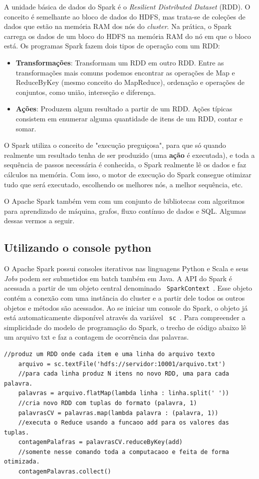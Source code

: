A unidade básica de dados do Spark é o \textit{Resilient Distributed Dataset} (RDD). O conceito é semelhante ao bloco de dados do HDFS, mas trata-se de coleções de dados que estão na memória RAM dos nós do \textit{cluster}. Na prática, o Spark carrega os dados de um bloco do HDFS na memória RAM do nó em que o bloco está. Os programas Spark fazem dois tipos de operação com um RDD:
\begin{itemize}
	\item \textbf{Transformações}: Transformam um RDD em outro RDD. Entre as transformações mais comuns podemos encontrar as operações de Map e ReduceByKey (mesmo conceito do MapReduce), ordenação e operações de conjuntos, como união, interseção e diferença.
	\item \textbf{Ações}: Produzem algum resultado a partir de um RDD. Ações típicas consistem em enumerar alguma quantidade de itens de um RDD, contar e somar. 
\end{itemize}

O Spark utiliza o conceito de "execução preguiçosa", para que só quando realmente um resultado tenha de ser produzido (uma \textbf{ação} é executada), e toda a sequência de passos necessária é conhecida, o Spark realmente lê os dados e faz cálculos na memória. Com isso, o motor de execução do Spark consegue otimizar tudo que será executado, escolhendo os melhores nós, a melhor sequência, etc.

O Apache Spark também vem com um conjunto de bibliotecas com algoritmos para aprendizado de máquina, grafos, fluxo contínuo de dados e SQL. Algumas dessas vermos a seguir.

\subsection{Utilizando o console python}
O Apache Spark possui consoles iterativos nas linguagens Python e Scala e seus \textit{Jobs} podem ser submetidos em batch também em Java. A API do Spark é acessada a partir de um objeto central denominado \texttt{ SparkContext }. Esse objeto contém a conexão com uma instância do cluster e a partir dele todos os outros objetos e métodos são acessados. Ao se iniciar um console do Spark, o objeto já está automaticamente disponível através da variável \texttt{ sc }. Para compreender a simplicidade do modelo de programação do Spark, o trecho de código abaixo lê um arquivo txt e faz a contagem de ocorrência das palavras.

\begin{lstlisting}[style=Python]
    //produz um RDD onde cada item e uma linha do arquivo texto
    arquivo = sc.textFile('hdfs://servidor:10001/arquivo.txt') 
    //para cada linha produz N itens no novo RDD, uma para cada palavra.
    palavras = arquivo.flatMap(lambda linha : linha.split(' ')) 
    //cria novo RDD com tuplas do formato (palavra, 1)
    palavrasCV = palavras.map(lambda palavra : (palavra, 1)) 
    //executa o Reduce usando a funcaoo add para os valores das tuplas.
    contagemPalafras = palavrasCV.reduceByKey(add) 
    //somente nesse comando toda a computacaoo e feita de forma otimizada.
    contagemPalavras.collect() 
\end{lstlisting}

